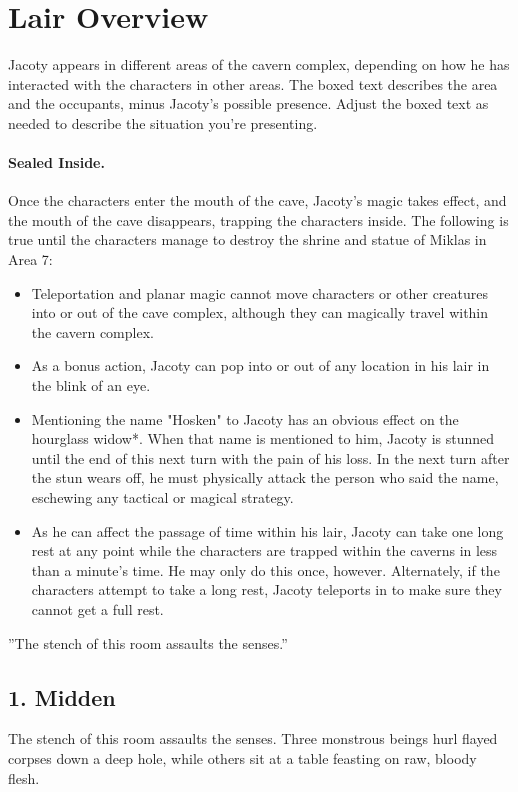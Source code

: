 \documentclass[10pt,a4paper,twoside,twocolumn,openany,bg=print,nodeprecatedcode]{dndbook}
\begin{document}
\section{Lair Overview}
Jacoty appears in different areas of the cavern complex, depending on how he has interacted with the characters in other areas. The boxed text describes the area and the occupants, minus Jacoty's possible presence. Adjust the boxed text as needed to describe the situation you're presenting.
\paragraph{Sealed Inside.}
Once the characters enter the mouth of the cave, Jacoty's magic takes effect, and the mouth of the cave disappears, trapping the characters inside. The following is true until the characters manage to destroy the shrine and statue of Miklas in Area 7:

\begin{itemize}
\item Teleportation and planar magic cannot move characters or other creatures into or out of the cave complex, although they can magically travel within the cavern complex.
\item As a bonus action, Jacoty can pop into or out of any location in his lair in the blink of an eye.
\item Mentioning the name "Hosken" to Jacoty has an obvious effect on the hourglass widow*. When that name is mentioned to him, Jacoty is stunned until the end of this next turn with the pain of his loss. In the next turn after the stun wears off, he must physically attack the person who said the name, eschewing any tactical or magical strategy.
\item As he can affect the passage of time within his lair, Jacoty can take one long rest at any point while the characters are trapped within the caverns in less than a minute's time. He may only do this once, however. Alternately, if the characters attempt to take a long rest, Jacoty teleports in to make sure they cannot get a full rest.
\end{itemize}

\DndQuote%
{}
{''The stench of this room assaults the senses.''}
{}
\subsection{1. Midden}
\begin{DndReadAloud}{}
The stench of this room assaults the senses. Three monstrous beings hurl flayed corpses down a deep hole, while others sit at a table feasting on raw, bloody flesh.
\end{DndReadAloud}
\end{document}
